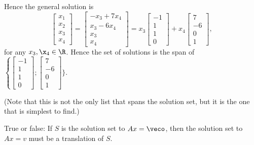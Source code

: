 {Hence the general solution is \[
\left[ \begin{array}{c} x_1 \\ x_2 \\ x_3 \\ x_4 \end{array}\right] = 
\left[ \begin{array}{c} -x_3 + 7x_4 \\ x_3 - 6x_4 \\ x_3 \\ x_4 \end{array}\right] = 
x_3 \left[ \begin{array}{c} -1 \\ 1 \\ 1 \\ 0 \end{array}\right] + 
x_4 \left[ \begin{array}{c} 7 \\ - 6 \\ 0 \\ 1 \end{array}\right],
\]
for any $x_3,\x_4 \in \R$.  Hence the set of solutions is the span of  
$\left\{ \left[ \begin{array}{c} -1 \\ 1 \\ 1 \\ 0 \end{array} \right]; 
\left[ \begin{array}{c} 7 \\ -6 \\ 0 \\ 1 \end{array} \right]\}.$

(Note that this is not the only list that spans the solution set, but it is the one that is simplest to find.)

}


\endedxproblem





     

True or false: If $S$ is the solution set to $Ax = \veco$, then the solution set to 
$Ax = v$ must be a translation of $S$.  




